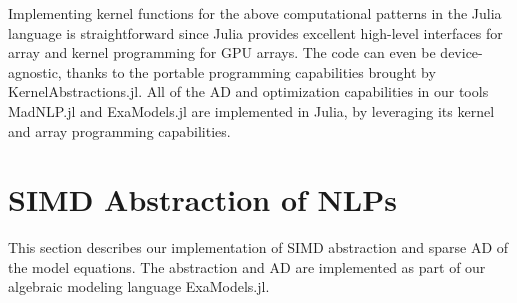 \documentclass{IEEEtran4PSCC} %
\begin{document}
Implementing kernel functions for the above computational patterns in
the Julia language is straightforward since Julia provides excellent
high-level interfaces for array and kernel programming for GPU
arrays. The code can even be device-agnostic, thanks to the portable
programming capabilities brought by KernelAbstractions.jl. All
of the AD and optimization capabilities in our
tools MadNLP.jl and ExaModels.jl are implemented in  Julia,
by leveraging its kernel and array programming capabilities.


\section{SIMD Abstraction of NLPs}\label{sec:simd}

This section describes our implementation of SIMD abstraction and
sparse AD of the model equations. The abstraction and AD are
implemented as part of our algebraic modeling language ExaModels.jl.
\end{document}
